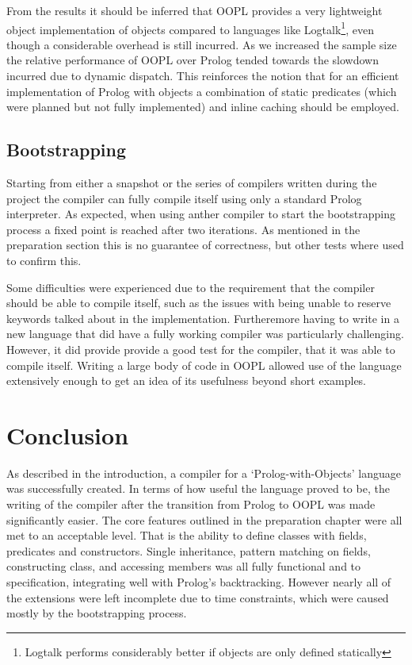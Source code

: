 \documentclass[12pt,a4paper,twoside,openright]{report}
\begin{document}
\bigskip

From the results it should be inferred that OOPL provides a very lightweight object implementation of objects compared to languages like Logtalk\footnote{Logtalk performs considerably better if objects are only defined statically}, even though a considerable overhead is still incurred. As we increased the sample size the relative performance of OOPL over Prolog tended towards the slowdown incurred due to dynamic dispatch. This reinforces the notion that for an efficient implementation of Prolog with objects a combination of static predicates (which were planned but not fully implemented) and inline caching should be employed.

\section{Bootstrapping}

Starting from either a snapshot or the series of compilers written during the project the compiler can fully compile itself using only a standard Prolog interpreter. As expected, when using anther compiler to start the bootstrapping process a fixed point is reached after two iterations. As mentioned in the preparation section this is no guarantee of correctness, but other tests where used to confirm this.

\bigskip

Some difficulties were experienced due to the requirement that the compiler should be able to compile itself, such as the issues with being unable to reserve keywords talked about in the implementation. Furtheremore having to write in a new language that did have a fully working compiler was particularly challenging. However, it did provide provide a good test for the compiler, that it was able to compile itself. Writing a large body of code in OOPL allowed use of the language extensively enough to get an idea of its usefulness beyond short examples.

\chapter{Conclusion}

As described in the introduction, a compiler for a `Prolog-with-Objects' language was successfully created. In terms of how useful the language proved to be, the writing of the compiler after the transition from Prolog to OOPL was made significantly easier. The core features outlined in the preparation chapter were all met to an acceptable level. That is the ability to define classes with fields, predicates and constructors. Single inheritance, pattern matching on fields, constructing class, and accessing members was all fully functional and to specification, integrating well with Prolog's backtracking. However nearly all of the extensions were left incomplete due to time constraints, which were caused mostly by the bootstrapping process.
\end{document}
